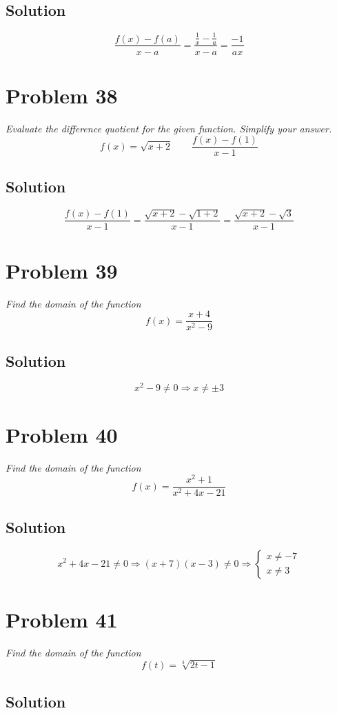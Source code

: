 \documentclass[11pt]{article}
\newcommand{\soln}{\subsection*}
\newcommand{\qn}{\textit}
\begin{document}
\soln{Solution}
\begin{equation*}
	\frac{f(x)-f(a)}{x-a} = \frac{\frac{1}{x}-\frac{1}{a}}{x-a} = \frac{-1}{ax}
\end{equation*}

\section*{Problem 38}

\qn{Evaluate the difference quotient for the given function. Simplify your answer. $$f(x)=\sqrt{x+2} \qquad \frac{f(x)-f(1)}{x-1}$$}

\soln{Solution}
\begin{equation*}
	\frac{f(x)-f(1)}{x-1} = \frac{\sqrt{x+2}-\sqrt{1+2}}{x-1} = \frac{\sqrt{x+2}-\sqrt{3}}{x-1}
\end{equation*}

\section*{Problem 39}

\qn{Find the domain of the function $$f(x)=\frac{x+4}{x^2-9}$$}

\soln{Solution}
\begin{equation*}
	x^2-9 \ne 0 \Rightarrow x \ne \pm 3
\end{equation*}

\section*{Problem 40}

\qn{Find the domain of the function $$f(x)=\frac{x^2+1}{x^2+4x-21}$$}

\soln{Solution}
\begin{equation*}
	x^2+4x-21 \ne 0 \Rightarrow (x+7)(x-3) \ne 0 \Rightarrow
	\begin{cases}
		x \ne -7 \\
		x \ne 3
	\end{cases}
\end{equation*}

\section*{Problem 41}

\qn{Find the domain of the function $$f(t)=\sqrt[3]{2t-1}$$}

\soln{Solution}
\begin{equation*}
	[-\infty, \infty]
\end{equation*}
\end{document}
